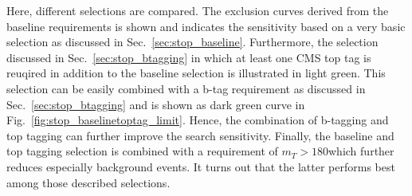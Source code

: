 Here, different selections are compared. The exclusion curves derived from the baseline requirements is shown and indicates the sensitivity based on a very basic selection as discussed in Sec.~\ref{sec:stop_baseline}. Furthermore, the selection discussed in Sec.~\ref{sec:stop_btagging} in which at least one CMS top tag is reuqired in addition to the baseline selection is illustrated in light green. This selection can be easily combined with a b-tag requirement as discussed in Sec.~\ref{sec:stop_btagging} and is shown as dark green curve in Fig.~\ref{fig:stop_baselinetoptag_limit}. Hence, the combination of b-tagging and top tagging can further improve the search sensitivity. Finally, the baseline and top tagging selection is combined with a requirement of $m_T > 180$\gev which further reduces especially \ttbar background events. It turns out that the latter performs best among those described selections. 

